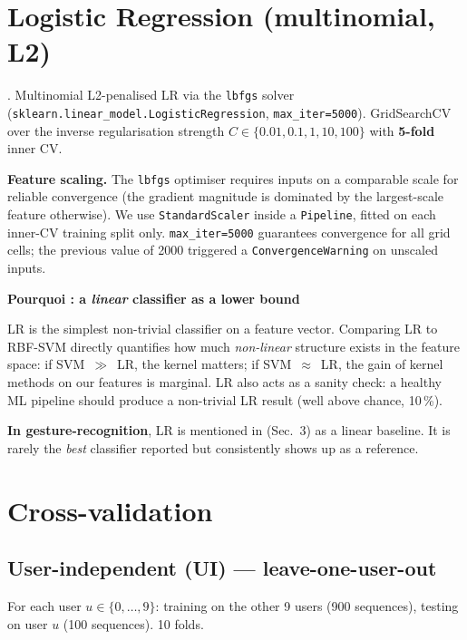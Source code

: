 \documentclass[11pt,a4paper]{article}
\newenvironment{whybox}[1]{%
    \begin{shaded*}\noindent\textbf{Pourquoi : #1}\par\vspace{0.3em}}
    {\end{shaded*}}
\renewenvironment{shaded*}
    {\definecolor{shadecolor}{named}{whyboxbg}\begin{shaded}}
    {\end{shaded}}
\begin{document}
\section{Logistic Regression (multinomial, L2)}

\cite{cox1958regression, hosmer2013logistic, hastie2009elements}.
Multinomial L2-penalised LR via the \verb|lbfgs| solver
(\verb|sklearn.linear_model.LogisticRegression|, \verb|max_iter=5000|).
GridSearchCV over the inverse regularisation strength
$C\in\{0.01, 0.1, 1, 10, 100\}$ with \textbf{5-fold} inner CV.

\textbf{Feature scaling.}  The \verb|lbfgs| optimiser requires
inputs on a comparable scale for reliable convergence (the gradient
magnitude is dominated by the largest-scale feature otherwise).
We use \texttt{StandardScaler} inside a \texttt{Pipeline}, fitted on
each inner-CV training split only.  \verb|max_iter=5000| guarantees
convergence for all grid cells; the previous value of 2000 triggered
a \texttt{ConvergenceWarning} on unscaled inputs.

\begin{whybox}{a \emph{linear} classifier as a lower bound}
LR is the simplest non-trivial classifier on a feature vector. Comparing
LR to RBF-SVM directly quantifies how much \emph{non-linear} structure
exists in the feature space: if SVM~$\gg$~LR, the kernel matters; if
SVM~$\approx$~LR, the gain of kernel methods on our features is marginal.
LR also acts as a sanity check: a healthy ML pipeline should produce
a non-trivial LR result (well above chance, 10\,\%).
\end{whybox}

\textbf{In gesture-recognition}, LR is mentioned in
\cite{wuhuang1999vision} (Sec.~3) as a linear baseline. It is rarely
the \emph{best} classifier reported but consistently shows up as a
reference.

\section{Cross-validation}

\subsection{User-independent (UI) --- leave-one-user-out}
For each user $u\in\{0,\dots,9\}$: training on the other 9 users
(900 sequences), testing on user $u$ (100 sequences). 10 folds.
\end{document}
